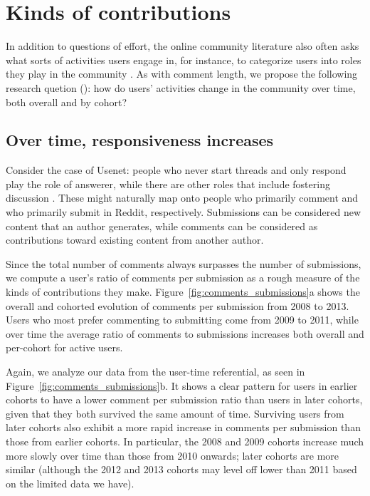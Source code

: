 \section{Kinds of contributions}

In addition to questions of effort, the online community literature also often asks what sorts of activities users engage in, for instance, to categorize users into roles they play in the community \cite{Welser2011}. As with comment length, we propose the following research quetion (\ResearchQuestion\label{rq:typeOfActivity}): how do users' activities change in the community over time, both overall and by cohort?

\subsection{Over time, responsiveness increases}
Consider the case of Usenet: people who never start threads and only respond play the role of answerer, while there are other roles that include fostering discussion \cite{Welser2007}.  These might naturally map onto people who primarily comment and who primarily submit in Reddit, respectively.  Submissions can be considered new content that an author generates, while comments can be considered as contributions toward existing content from another author.

Since the total number of comments always surpasses the number of submissions, we compute a user's ratio of comments per submission as a rough measure of the kinds of contributions they make.  Figure~\ref{fig:comments_submissions}a shows the overall and cohorted evolution of comments per submission from 2008 to 2013.  Users who most prefer commenting to submitting come from 2009 to 2011, while over time the average ratio of comments to submissions increases both overall and per-cohort for active users.

Again, we analyze our data from the user-time referential, as seen in Figure~\ref{fig:comments_submissions}b. It shows a clear pattern for users in earlier cohorts to have a lower comment per submission ratio than users in later cohorts, given that they both survived the same amount of time.  Surviving users from later cohorts also exhibit a more rapid increase in comments per submission than those from earlier cohorts.  In particular, the 2008 and 2009 cohorts increase much more slowly over time than those from 2010 onwards; later cohorts are more similar (although the 2012 and 2013 cohorts may level off lower than 2011 based on the limited data we have). 

